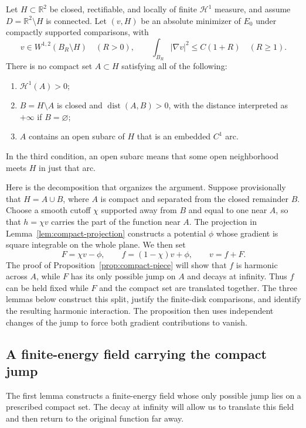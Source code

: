 \begin{proposition}
\label{prop:compact-piece}
Let $H\subset\mathbb R^2$ be closed, rectifiable, and locally of finite
$\mathcal H^1$ measure, and assume $D=\mathbb R^2\setminus H$ is connected.
Let $(v,H)$ be an absolute minimizer of $E_0$ under compactly supported
comparisons, with
\[
 v\in W^{1,2}(B_R\setminus H)\quad(R>0),\qquad
 \int_{B_R}|\nabla v|^2\leq C(1+R)\quad(R\geq1).
\]
There is no compact set $A\subset H$ satisfying all of the following:
\begin{enumerate}
 \item $\mathcal H^1(A)>0$;
 \item $B=H\setminus A$ is closed and $\operatorname{dist}(A,B)>0$,
       with the distance interpreted as $+\infty$ if $B=\varnothing$;
 \item $A$ contains an open subarc of $H$ that is an embedded $C^1$ arc.
\end{enumerate}
In the third condition, an open subarc means that some open neighborhood
meets $H$ in just that arc.
\end{proposition}

Here is the decomposition that organizes the argument. Suppose provisionally
that $H=A\cup B$, where $A$ is compact and separated from the closed remainder
$B$. Choose a smooth cutoff $\chi$ supported away from $B$ and equal to one
near $A$, so that $h=\chi v$ carries the part of the function near $A$.
The projection in Lemma~\ref{lem:compact-projection} constructs a potential
$\phi$ whose gradient is square integrable on the whole plane. We then set
\[
 F=\chi v-\phi,\qquad f=(1-\chi)v+\phi,\qquad v=f+F.
\]
The proof of Proposition~\ref{prop:compact-piece} will show that $f$ is
harmonic across $A$, while $F$ has its only possible jump on $A$ and decays
at infinity. Thus $f$ can be held fixed while $F$ and the compact set are
translated together. The three lemmas below construct this split, justify
the finite-disk comparisons, and identify the resulting harmonic
interaction. The proposition then uses independent changes of the jump to
force both gradient contributions to vanish.

\subsection{A finite-energy field carrying the compact jump}

The first lemma constructs a finite-energy field whose only possible jump
lies on a prescribed compact set. The decay at infinity will allow us to
translate this field and then return to the original function far away.

